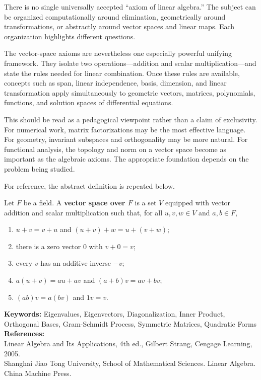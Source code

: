 There is no single universally accepted ``axiom of linear algebra.'' The subject can be organized computationally around elimination, geometrically around transformations, or abstractly around vector spaces and linear maps. Each organization highlights different questions.

The vector-space axioms are nevertheless one especially powerful unifying framework. They isolate two operations---addition and scalar multiplication---and state the rules needed for linear combination. Once these rules are available, concepts such as span, linear independence, basis, dimension, and linear transformation apply simultaneously to geometric vectors, matrices, polynomials, functions, and solution spaces of differential equations.

This should be read as a pedagogical viewpoint rather than a claim of exclusivity. For numerical work, matrix factorizations may be the most effective language. For geometry, invariant subspaces and orthogonality may be more natural. For functional analysis, the topology and norm on a vector space become as important as the algebraic axioms. The appropriate foundation depends on the problem being studied.

For reference, the abstract definition is repeated below.

\begin{definition}
Let $F$ be a field. A \textbf{vector space over $F$} is a set $V$ equipped with vector addition and scalar multiplication such that, for all $u,v,w\in V$ and $a,b\in F$,
\begin{enumerate}
    \item $u+v=v+u$ and $(u+v)+w=u+(v+w)$;
    \item there is a zero vector $0$ with $v+0=v$;
    \item every $v$ has an additive inverse $-v$;
    \item $a(u+v)=au+av$ and $(a+b)v=av+bv$;
    \item $(ab)v=a(bv)$ and $1v=v$.
\end{enumerate}
\end{definition}

\vspace{1cm}
\noindent
\textbf{Keywords:} Eigenvalues, Eigenvectors, Diagonalization, Inner Product, Orthogonal Bases, Gram-Schmidt Process, Symmetric Matrices, Quadratic Forms \\
\textbf{References:} \\
Linear Algebra and Its Applications, 4th ed., Gilbert Strang, Cengage Learning, 2005. \\
Shanghai Jiao Tong University, School of Mathematical Sciences. Linear Algebra. China Machine Press.

\cleardoublepage
